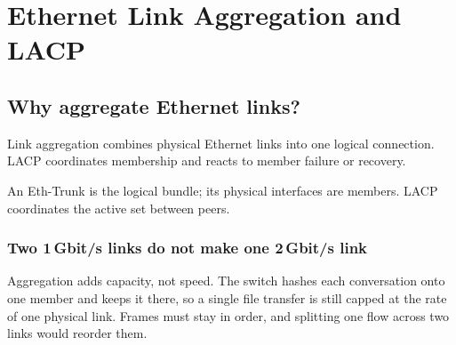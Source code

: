\chapter{Ethernet Link Aggregation and LACP}\label{ch:lacp}

\section{Why aggregate Ethernet links?}
Link aggregation combines physical Ethernet links into one logical connection. LACP coordinates membership and reacts to member failure or recovery.



\begin{keyidea}
An Eth-Trunk is the logical bundle; its physical interfaces are members. LACP coordinates the active set between peers.
\end{keyidea}

\subsection{Two 1\,Gbit/s links do not make one 2\,Gbit/s link}
Aggregation adds capacity, not speed. The switch hashes each
conversation onto one member and keeps it there, so a single file
transfer is still capped at the rate of one physical link. Frames must
stay in order, and splitting one flow across two links would reorder
them.

